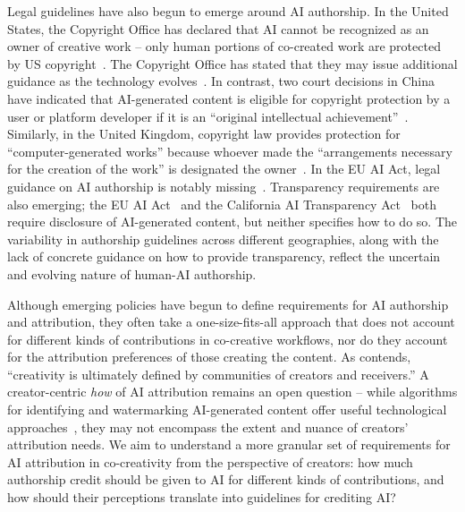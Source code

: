 Legal guidelines have also begun to emerge around AI authorship. In the United States, the Copyright Office has declared that AI cannot be recognized as an owner of creative work -- only human portions of co-created work are protected by US copyright~\cite{zirpoli2023generative}. The Copyright Office has stated that they may issue additional guidance as the technology evolves~\cite{zirpoli2023generative}. In contrast, two court decisions in China have indicated that AI-generated content is eligible for copyright protection by a user or platform developer if it is an ``original intellectual achievement''~\cite{cooley2024}. Similarly, in the United Kingdom, copyright law provides protection for ``computer-generated works'' because whoever made the ``arrangements necessary for the creation of the work'' is designated the owner~\cite{cooley2024}. In the EU AI Act, legal guidance on AI authorship is notably missing~\cite{cooley2024}. Transparency requirements are also emerging; the EU AI Act~\cite{eu2023ai} and the California AI Transparency Act~\cite{california2024ai} both require disclosure of AI-generated content, but neither specifies how to do so. The variability in authorship guidelines across different geographies, along with the lack of concrete guidance on how to provide transparency, reflect the uncertain and evolving nature of human-AI authorship.

Although emerging policies have begun to define requirements for AI authorship and attribution, they often take a one-size-fits-all approach that does not account for different kinds of contributions in co-creative workflows, nor do they account for the attribution preferences of those creating the content. As \citet{sarkar2023exploring} contends, ``creativity is ultimately defined by communities of creators and receivers.'' 
A creator-centric \emph{how} of AI attribution remains an open question -- while algorithms for identifying and watermarking AI-generated content offer useful technological approaches~\cite{dathathri2024scalable, fernandez2023stable, hu2023radar}, they may not encompass the extent and nuance of creators' attribution needs. We aim to understand a more granular set of requirements for AI attribution in co-creativity from the perspective of creators: how much authorship credit should be given to AI for different kinds of contributions, and how should their perceptions translate into guidelines for crediting AI?



